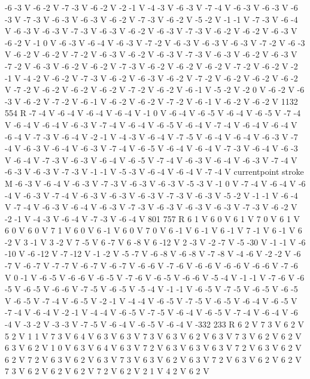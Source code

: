 {{-6 -3 V
-6 -2 V
-7 -3 V
-6 -2 V
-2 -1 V
-4 -3 V
-6 -3 V
-7 -4 V
-6 -3 V
-6 -3 V
-6 -3 V
-7 -3 V
-6 -3 V
-6 -3 V
-6 -2 V
-7 -3 V
-6 -2 V
-5 -2 V
-1 -1 V
-7 -3 V
-6 -4 V
-6 -3 V
-6 -3 V
-7 -3 V
-6 -3 V
-6 -2 V
-6 -3 V
-7 -3 V
-6 -2 V
-6 -2 V
-6 -3 V
-6 -2 V
-1 0 V
-6 -3 V
-6 -4 V
-6 -3 V
-7 -2 V
-6 -3 V
-6 -3 V
-6 -3 V
-7 -2 V
-6 -3 V
-6 -2 V
-6 -2 V
-7 -2 V
-6 -3 V
-6 -2 V
-6 -3 V
-7 -3 V
-6 -3 V
-6 -2 V
-6 -3 V
-7 -2 V
-6 -3 V
-6 -2 V
-6 -2 V
-7 -3 V
-6 -2 V
-6 -2 V
-6 -2 V
-7 -2 V
-6 -2 V
-2 -1 V
-4 -2 V
-6 -2 V
-7 -3 V
-6 -2 V
-6 -3 V
-6 -2 V
-7 -2 V
-6 -2 V
-6 -2 V
-6 -2 V
-7 -2 V
-6 -2 V
-6 -2 V
-6 -2 V
-7 -2 V
-6 -2 V
-6 -1 V
-5 -2 V
-2 0 V
-6 -2 V
-6 -3 V
-6 -2 V
-7 -2 V
-6 -1 V
-6 -2 V
-6 -2 V
-7 -2 V
-6 -1 V
-6 -2 V
-6 -2 V
1132 554 R
-7 -4 V
-6 -4 V
-6 -4 V
-6 -4 V
-1 0 V
-6 -4 V
-6 -5 V
-6 -4 V
-6 -5 V
-7 -4 V
-6 -4 V
-6 -4 V
-6 -3 V
-7 -4 V
-6 -4 V
-6 -5 V
-6 -4 V
-7 -4 V
-6 -4 V
-6 -4 V
-6 -4 V
-7 -3 V
-6 -4 V
-2 -1 V
-4 -3 V
-6 -4 V
-7 -5 V
-6 -4 V
-6 -4 V
-6 -3 V
-7 -4 V
-6 -3 V
-6 -4 V
-6 -3 V
-7 -4 V
-6 -5 V
-6 -4 V
-6 -4 V
-7 -3 V
-6 -4 V
-6 -3 V
-6 -4 V
-7 -3 V
-6 -3 V
-6 -4 V
-6 -5 V
-7 -4 V
-6 -3 V
-6 -4 V
-6 -3 V
-7 -4 V
-6 -3 V
-6 -3 V
-7 -3 V
-1 -1 V
-5 -3 V
-6 -4 V
-6 -4 V
-7 -4 V
currentpoint stroke M
-6 -3 V
-6 -4 V
-6 -3 V
-7 -3 V
-6 -3 V
-6 -3 V
-5 -3 V
-1 0 V
-7 -4 V
-6 -4 V
-6 -4 V
-6 -3 V
-7 -4 V
-6 -3 V
-6 -3 V
-6 -3 V
-7 -3 V
-6 -3 V
-5 -2 V
-1 -1 V
-6 -4 V
-7 -4 V
-6 -3 V
-6 -4 V
-6 -3 V
-7 -3 V
-6 -3 V
-6 -3 V
-6 -3 V
-7 -3 V
-6 -2 V
-2 -1 V
-4 -3 V
-6 -4 V
-7 -3 V
-6 -4 V
801 757 R
6 1 V
6 0 V
6 1 V
7 0 V
6 1 V
6 0 V
6 0 V
7 1 V
6 0 V
6 -1 V
6 0 V
7 0 V
6 -1 V
6 -1 V
6 -1 V
7 -1 V
6 -1 V
6 -2 V
3 -1 V
3 -2 V
7 -5 V
6 -7 V
6 -8 V
6 -12 V
2 -3 V
-2 -7 V
-5 -30 V
-1 -1 V
-6 -10 V
-6 -12 V
-7 -12 V
-1 -2 V
-5 -7 V
-6 -8 V
-6 -8 V
-7 -8 V
-4 -6 V
-2 -2 V
-6 -7 V
-6 -7 V
-7 -7 V
-6 -7 V
-6 -7 V
-6 -6 V
-7 -6 V
-6 -6 V
-6 -6 V
-6 -6 V
-7 -6 V
0 -1 V
-6 -5 V
-6 -6 V
-6 -5 V
-7 -6 V
-6 -5 V
-6 -6 V
-5 -4 V
-1 -1 V
-7 -6 V
-6 -5 V
-6 -5 V
-6 -6 V
-7 -5 V
-6 -5 V
-5 -4 V
-1 -1 V
-6 -5 V
-7 -5 V
-6 -5 V
-6 -5 V
-6 -5 V
-7 -4 V
-6 -5 V
-2 -1 V
-4 -4 V
-6 -5 V
-7 -5 V
-6 -5 V
-6 -4 V
-6 -5 V
-7 -4 V
-6 -4 V
-2 -1 V
-4 -4 V
-6 -5 V
-7 -5 V
-6 -4 V
-6 -5 V
-7 -4 V
-6 -4 V
-6 -4 V
-3 -2 V
-3 -3 V
-7 -5 V
-6 -4 V
-6 -5 V
-6 -4 V
-332 233 R
6 2 V
7 3 V
6 2 V
5 2 V
1 1 V
7 3 V
6 4 V
6 3 V
6 3 V
7 3 V
6 3 V
6 2 V
6 3 V
7 3 V
6 2 V
6 2 V
6 3 V
6 2 V
1 0 V
6 3 V
6 4 V
6 3 V
7 2 V
6 3 V
6 3 V
6 3 V
7 2 V
6 3 V
6 2 V
6 2 V
7 2 V
6 3 V
6 2 V
6 3 V
7 3 V
6 3 V
6 2 V
6 3 V
7 2 V
6 3 V
6 2 V
6 2 V
7 3 V
6 2 V
6 2 V
6 2 V
7 2 V
6 2 V
2 1 V
4 2 V
6 2 V
}}
